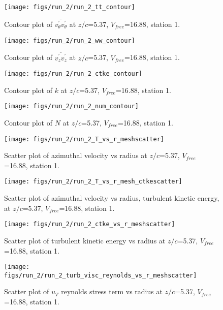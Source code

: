 \begin{figure}[H]
\centering
\texttt{[image: figs/run\_2/run\_2\_tt\_contour]}
\caption{Contour plot of $\overline{v_{\theta}^{\prime} v_{\theta}^{\prime}}$ at $z/c$=5.37, $V_{free}$=16.88, station 1.}
\end{figure}


\begin{figure}[H]
\centering
\texttt{[image: figs/run\_2/run\_2\_ww\_contour]}
\caption{Contour plot of $\overline{v_{z}^{\prime} v_{z}^{\prime}}$ at $z/c$=5.37, $V_{free}$=16.88, station 1.}
\end{figure}


\begin{figure}[H]
\centering
\texttt{[image: figs/run\_2/run\_2\_ctke\_contour]}
\caption{Contour plot of $k$ at $z/c$=5.37, $V_{free}$=16.88, station 1.}
\end{figure}


\begin{figure}[H]
\centering
\texttt{[image: figs/run\_2/run\_2\_num\_contour]}
\caption{Contour plot of $N$ at $z/c$=5.37, $V_{free}$=16.88, station 1.}
\end{figure}


\begin{figure}[H]
\centering
\texttt{[image: figs/run\_2/run\_2\_T\_vs\_r\_meshscatter]}
\caption{Scatter plot of azimuthal velocity vs radius at $z/c$=5.37, $V_{free}$=16.88, station 1.}
\end{figure}


\begin{figure}[H]
\centering
\texttt{[image: figs/run\_2/run\_2\_T\_vs\_r\_mesh\_ctkescatter]}
\caption{Scatter plot of azimuthal velocity vs radius, turbulent kinetic energy, at $z/c$=5.37, $V_{free}$=16.88, station 1.}
\end{figure}


\begin{figure}[H]
\centering
\texttt{[image: figs/run\_2/run\_2\_ctke\_vs\_r\_meshscatter]}
\caption{Scatter plot of turbulent kinetic energy vs radius at $z/c$=5.37, $V_{free}$=16.88, station 1.}
\end{figure}


\begin{figure}[H]
\centering
\texttt{[image: figs/run\_2/run\_2\_turb\_visc\_reynolds\_vs\_r\_meshscatter]}
\caption{Scatter plot of $
u_T$ reynolds stress term vs radius at $z/c$=5.37, $V_{free}$=16.88, station 1.}
\end{figure}



